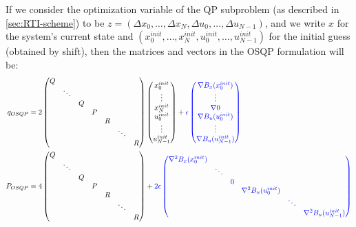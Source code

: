 \documentclass[12pt]{article}
\begin{document}
If we consider the optimization variable of the QP subproblem (as described in \ref{sec:RTI-scheme}) to be $z=(\Delta x_0,\dots,\Delta x_N,\Delta u_0, \dots,\Delta u_{N-1})$, and we write $x$ for the system's current state and  $(x_0^{init},\dots,x_{N}^{init},u_0^{init},\dots,u_{N-1}^{init})$ for the initial guess (obtained by shift), then the matrices and vectors in the OSQP formulation will be:
\scriptsize
\begin{align*}
	q_{OSQP}&=2\begin{pmatrix}
		Q&&&&&&\\
		&\ddots&&&&&\\
		&&Q&&&&\\
		&&&P&&&\\
		&&&&R&&\\
		&&&&&\ddots&\\
		&&&&&&R
	\end{pmatrix}\begin{pmatrix}
		x_0^{init}\\\vdots\\x_N^{init}\\u_0^{init}\\\vdots\\u_{N-1}^{init}
	\end{pmatrix}+\color{blue}\epsilon\begin{pmatrix}
		\nabla B_x(x_0^{init})\\\vdots\\\nabla 0\\\nabla B_u(u_0^{init})\\\vdots\\\nabla B_u(u_{N-1}^{init})
	\end{pmatrix}\color{black}\\
	P_{OSQP}&=4\begin{pmatrix}
		Q&&&&&&\\
		&\ddots&&&&&\\
		&&Q&&&&\\
		&&&P&&&\\
		&&&&R&&\\
		&&&&&\ddots&\\
		&&&&&&R
	\end{pmatrix}+\color{blue}2\epsilon\begin{pmatrix}
		\nabla^2B_x(x_0^{init})&&&&&\\
		&\ddots&&&&\\
		&&0&&&\\
		&&&\nabla^2B_u(u_0^{init})&&\\
		&&&&\ddots&\\
		&&&&&\nabla^2B_u(u_{N-1}^{init})
	\end{pmatrix}\color{black}
\end{align*}
\end{document}
